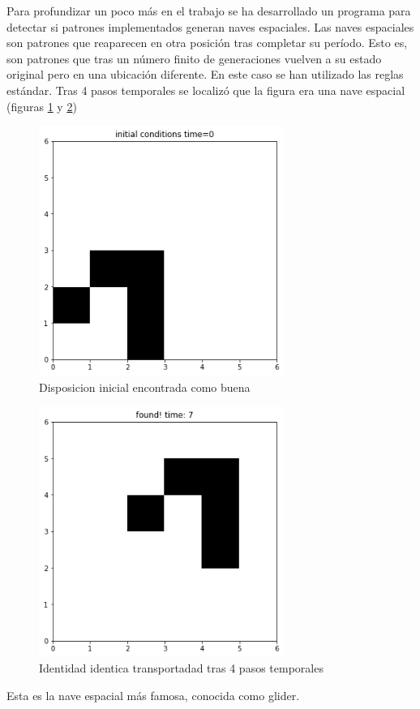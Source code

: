   Para profundizar un poco más en el trabajo se ha desarrollado un programa para detectar si patrones implementados generan naves espaciales.
  Las naves espaciales son patrones que reaparecen en otra posición tras completar su período. Esto es, son patrones que tras un número finito de generaciones vuelven a su estado original pero en una ubicación diferente.
  En este caso se han utilizado las reglas estándar. Tras 4 pasos temporales se localizó que la figura era una nave espacial (figuras \ref{gol4} y \ref{gol5})
   \begin{figure}
   	\centering
   	\includegraphics[width=8cm]{searcher_1}
   	\caption{Disposicion inicial encontrada como buena }
   	\label{gol4}
   \end{figure}
    \begin{figure}
    	\centering
    	\includegraphics[width=8cm]{searcher_2}
    	\caption{Identidad identica transportadad tras 4 pasos temporales }
    	\label{gol5}
    \end{figure}
    Esta es la nave espacial más famosa, conocida como glider.
